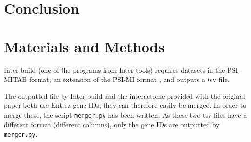 \documentclass[letterpaper]{article}
\begin{document}
\section{Conclusion}

\section{Materials and Methods}
	Inter-build (one of the programs from Inter-tools) requires datasets in the PSI-MITAB format, an extension of the
	PSI-MI format \citep{MITABFormat}, and outputs a tsv file.

	The outputted file by Inter-build and the interactome provided with the original paper both use Entrez gene IDs, they
	can therefore easily be merged. In order to merge these, the script \texttt{merger.py} has been written. As these two
	tsv files have a different format (different columns), only the gene IDs are outputted by \texttt{merger.py}.

\footnotesize

{}
\end{document}
